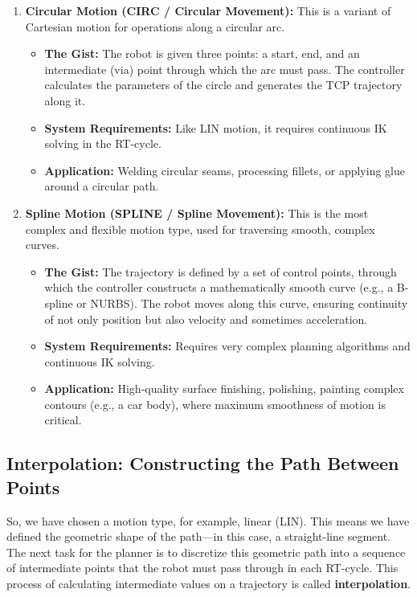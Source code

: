 \begin{enumerate}
    \item \textbf{Circular Motion (CIRC / Circular Movement):} This is a variant of Cartesian motion for operations along a circular arc.
    \begin{itemize}
        \item \textbf{The Gist:} The robot is given three points: a start, end, and an intermediate (via) point through which the arc must pass. The controller calculates the parameters of the circle and generates the TCP trajectory along it.
        \item \textbf{System Requirements:} Like LIN motion, it requires continuous IK solving in the RT-cycle.
        \item \textbf{Application:} Welding circular seams, processing fillets, or applying glue around a circular path.
    \end{itemize}
    
    \item \textbf{Spline Motion (SPLINE / Spline Movement):} This is the most complex and flexible motion type, used for traversing smooth, complex curves.
    \begin{itemize}
        \item \textbf{The Gist:} The trajectory is defined by a set of control points, through which the controller constructs a mathematically smooth curve (e.g., a B-spline or NURBS). The robot moves along this curve, ensuring continuity of not only position but also velocity and sometimes acceleration.
        \item \textbf{System Requirements:} Requires very complex planning algorithms and continuous IK solving.
        \item \textbf{Application:} High-quality surface finishing, polishing, painting complex contours (e.g., a car body), where maximum smoothness of motion is critical.
    \end{itemize}
\end{enumerate}

\subsection{Interpolation: Constructing the Path Between Points}
\label{sec:interpolation}
So, we have chosen a motion type, for example, linear (LIN). This means we have defined the geometric shape of the path—in this case, a straight-line segment. The next task for the planner is to discretize this geometric path into a sequence of intermediate points that the robot must pass through in each RT-cycle. This process of calculating intermediate values on a trajectory is called \textbf{interpolation}.

